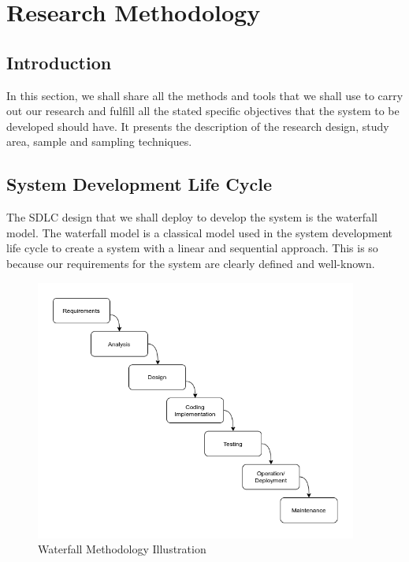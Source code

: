 \documentclass{article}
\begin{document}
\newpage
\section{Research Methodology}
\subsection{Introduction }
In this section, we shall share all the methods and tools that we shall use to carry out our research and fulfill all the stated specific objectives that the system to be developed should have.  It presents the description of the research design, study area, sample and sampling techniques. 

\subsection{System Development Life Cycle}
The SDLC design that we shall deploy to develop the system is the waterfall model. The waterfall model is a classical model used in the system development life cycle to create a system with a linear and sequential approach. This is so because our requirements for the system are clearly defined and well-known.


\vspace{10px}
\begin{figure}[H]
    \centering
    \includegraphics[width=400px]{Images/waterfallv2.png}
    \caption{Waterfall Methodology Illustration}
    \label{waterfall-SDLC-method-image}
\end{figure}
\vspace{10px}
\end{document}

